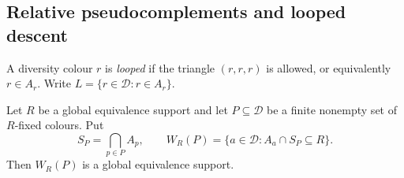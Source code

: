\subsection{Relative pseudocomplements and looped descent}

A diversity colour $r$ is \emph{looped} if the triangle $(r,r,r)$ is
allowed, or equivalently $r\in A_r$. Write
$L=\{r\in\mathcal D:r\in A_r\}$.

\begin{lemma}
\label{lem:rh-pseudo}
Let $R$ be a global equivalence support and let $P\subseteq\mathcal D$
be a finite nonempty set of $R$-fixed colours. Put
\[
 S_P=\bigcap_{p\in P}A_p,
 \qquad W_R(P)=\{a\in\mathcal D:A_a\cap S_P\subseteq R\}.
\]
Then $W_R(P)$ is a global equivalence support.
\end{lemma}
